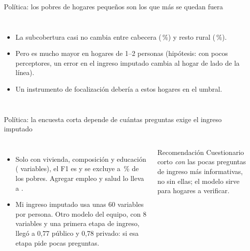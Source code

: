 \begin{frame}{Política: los pobres de hogares pequeños son los que más se quedan fuera}
  \begin{columns}[T]
    \small
    \begin{itemize}\setlength{\itemsep}{3pt}
      \item La subcobertura casi no cambia entre cabecera (\nUnderCabecera\,\%) y resto rural (\nUnderRestorural\,\%).
      \item Pero es mucho mayor en hogares de 1--2 personas (hipótesis: con pocos perceptores, un error en el ingreso imputado cambia al hogar de lado de la línea).
      \item Un instrumento de focalización debería  a estos hogares en el umbral.
    \end{itemize}
  \end{columns}
\end{frame}

\begin{frame}{Política: la encuesta corta depende de cuántas preguntas exige el ingreso imputado}
  \begin{columns}[T]
    \small
    \begin{itemize}\setlength{\itemsep}{3pt}
      \item Solo con vivienda, composición y educación (\nNVarsSurveyMin{} variables), el F1 es \nFoneSurveyMin{} y se excluye a \nUnderSurveyMin\,\% de los pobres. Agregar empleo y salud lo lleva a \nFoneSurveyShort{}.
      \item Mi ingreso imputado usa unas 60 variables por persona. Otro modelo del equipo, con 8 variables y una primera etapa de ingreso, llegó a 0,77 público y 0,78 privado:  si esa etapa pide pocas preguntas.
    \end{itemize}
    \vspace{1mm}
    \begin{block}{Recomendación}
      \footnotesize
      Cuestionario corto \emph{con} las pocas preguntas de ingreso más informativas, no sin ellas; el modelo sirve para  hogares a verificar.
    \end{block}
  \end{columns}
\end{frame}


